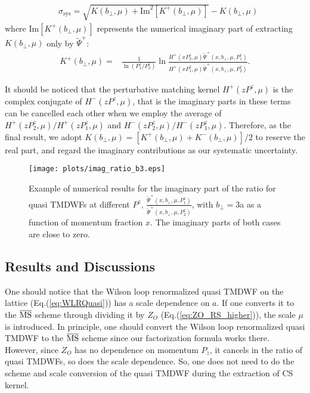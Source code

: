 \documentclass[prd,aps,twocolumn,preprintnumbers, showpacs, nofootinbib,superscriptaddress,notitlepage]{revtex4-1}
\begin{document}
\begin{align}
&\sigma_{\mathrm{sys}}=\sqrt{K(b_{\perp},\mu)+\text{Im}^2\left[K^+(b_{\perp},\mu)\right]}-K(b_{\perp},\mu)
\label{eq:systematical_error}
\end{align}
where $\text{Im}\left[K^+(b_{\perp},\mu)\right]$ represents the numerical imaginary part of extracting $K(b_{\perp},\mu)$ only by $\tilde{\Psi}^+$:
\begin{align}
K^+(b_{\perp},\mu)=&\frac{1}{\ln (P^z_1/P^z_2)}\ln\frac{H^+(xP^z_2,\mu)\tilde \Psi^+(x, b_\perp, \mu, P^z_1)}{H^+(xP^z_1,\mu)\tilde \Psi^+(x, b_\perp, \mu, P^z_2)}.
\label{eq:K+}
\end{align}

It should be noticed that the perturbative matching kernel $H^+(zP^z,\mu)$ is the complex conjugate of $H^-(zP^z,\mu)$, that is the imaginary parts in these terms can be cancelled each other when we employ the average of $H^+(zP_2^z,\mu)/H^+(zP_1^z,\mu)$ and $H^-(zP_2^z,\mu)/H^-(zP_1^z,\mu)$. Therefore, as the final result, we adopt $K(b_{\perp},\mu)=\left[K^+(b_{\perp},\mu)+K^-(b_{\perp},\mu)\right]/2$ to reserve the real part, and regard the imaginary contributions as our systematic uncertainty.

\begin{figure}
\centering
\texttt{[image: plots/imag\_ratio\_b3.eps]}
\caption{Example of numerical results for the imaginary part of the ratio for quasi TMDWFs at different $P^z$, $\frac{\tilde{\Psi}^+(x,b_{\perp},\mu,P_1^z)}{\tilde{\Psi}^+(x,b_{\perp},\mu,P_2^z)}$, with $b_{\perp}=3$a as a function of momentum fraction $x$. The imaginary parts of both cases are close to zero.}
    \label{fig:ratio_phi}
\end{figure}


\subsection{Results and Discussions}

One should notice that the Wilson loop renormalized quasi TMDWF on the lattice (Eq.(\ref{eq:WLRQuasi})) has a scale dependence on $a$. If one converts it to the $\overline{\rm MS}$ scheme through dividing it by $Z_{O}$ (Eq.(\ref{eq:ZO_RS_higher})), the scale $\mu$ is introduced. In principle, one should convert the Wilson loop renormalized quasi TMDWF to the $\overline{\rm MS}$ scheme since our factorization formula works there. However, since $Z_{O}$ has no dependence on momentum $P_{z}$, it cancels in the ratio of quasi TMDWFs, so does the scale dependence. So, one does not need to do the scheme and scale conversion of the quasi TMDWF during the extraction of CS kernel.
\end{document}
